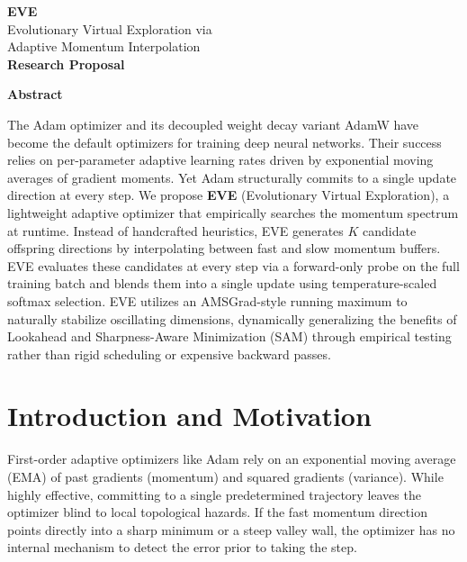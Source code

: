 \documentclass[12pt]{article}
\begin{document}
\begin{center}
  {\color{accent}\LARGE\bfseries EVE}\\[6pt]
  {\color{accent2}\Large Evolutionary Virtual Exploration via\\[4pt] Adaptive Momentum Interpolation}\\[12pt]
  {\normalsize\bfseries Research Proposal}\\[6pt]
\end{center}

\vspace{10pt}

\begin{center}
  {\bfseries Abstract}
\end{center}
\noindent
The Adam optimizer and its decoupled weight decay variant AdamW have become the default optimizers for training deep neural networks. Their success relies on per-parameter adaptive learning rates driven by exponential moving averages of gradient moments. Yet Adam structurally commits to a single update direction at every step. We propose \textbf{EVE} (Evolutionary Virtual Exploration), a lightweight adaptive optimizer that empirically searches the momentum spectrum at runtime. Instead of handcrafted heuristics, EVE generates $K$ candidate offspring directions by interpolating between fast and slow momentum buffers. EVE evaluates these candidates at every step via a forward-only probe on the full training batch and blends them into a single update using temperature-scaled softmax selection. EVE utilizes an AMSGrad-style running maximum to naturally stabilize oscillating dimensions, dynamically generalizing the benefits of Lookahead and Sharpness-Aware Minimization (SAM) through empirical testing rather than rigid scheduling or expensive backward passes.

\vspace{15pt}

\section{Introduction and Motivation}
\label{sec:intro}

First-order adaptive optimizers like Adam rely on an exponential moving average (EMA) of past gradients (momentum) and squared gradients (variance). While highly effective, committing to a single predetermined trajectory leaves the optimizer blind to local topological hazards. If the fast momentum direction points directly into a sharp minimum or a steep valley wall, the optimizer has no internal mechanism to detect the error prior to taking the step.
\end{document}

